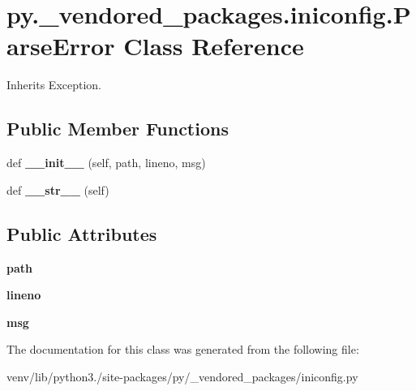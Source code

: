\hypertarget{classpy_1_1__vendored__packages_1_1iniconfig_1_1_parse_error}{}\section{py.\+\_\+vendored\+\_\+packages.\+iniconfig.\+Parse\+Error Class Reference}
\label{classpy_1_1__vendored__packages_1_1iniconfig_1_1_parse_error}


Inherits Exception.

\subsection*{Public Member Functions}
\begin{DoxyCompactItemize}
\item 
\mbox{\label{classpy_1_1__vendored__packages_1_1iniconfig_1_1_parse_error_a6c6d2f83a34b96a3ab7296f0e2227044}} 
def {\bfseries \+\_\+\+\_\+init\+\_\+\+\_\+} (self, path, lineno, msg)
\item 
\mbox{\label{classpy_1_1__vendored__packages_1_1iniconfig_1_1_parse_error_aa500f99785260b3f97cbcf42e325a1bc}} 
def {\bfseries \+\_\+\+\_\+str\+\_\+\+\_\+} (self)
\end{DoxyCompactItemize}
\subsection*{Public Attributes}
\begin{DoxyCompactItemize}
\item 
\mbox{\label{classpy_1_1__vendored__packages_1_1iniconfig_1_1_parse_error_a760334c892639ecc60696fc0a20fe663}} 
{\bfseries path}
\item 
\mbox{\label{classpy_1_1__vendored__packages_1_1iniconfig_1_1_parse_error_affa1b4ae6c990b931240dd1cb5bbd63e}} 
{\bfseries lineno}
\item 
\mbox{\label{classpy_1_1__vendored__packages_1_1iniconfig_1_1_parse_error_a3dcb1ba549d51216b0fade46492690b0}} 
{\bfseries msg}
\end{DoxyCompactItemize}


The documentation for this class was generated from the following file\+:\begin{DoxyCompactItemize}
\item 
venv/lib/python3./site-\/packages/py/\+\_\+vendored\+\_\+packages/iniconfig.\+py\end{DoxyCompactItemize}
